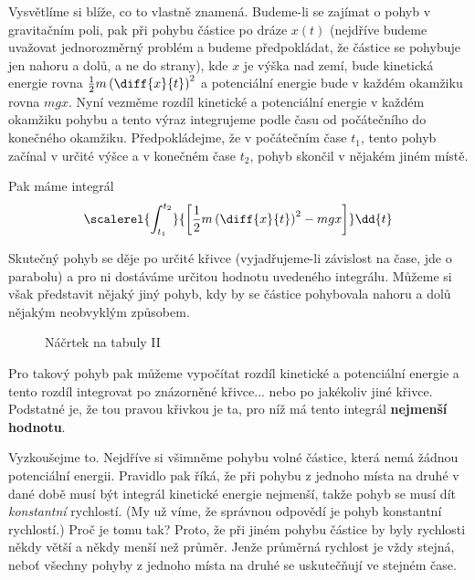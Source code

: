     Vysvětlíme si blíže, co to vlastně znamená. Budeme-li se zajímat o pohyb v gravitačním poli, pak
    při pohybu částice po dráze \(x(t)\) (nejdříve budeme uvažovat jednorozměrný problém a budeme
    předpokládat, že částice se pohybuje jen nahoru a dolů, a ne do strany), kde \(x\) je výška nad
    zemí, bude kinetická energie rovna \(\frac{1}{2}m\left(\diff{x}{t}\right)^2\) a potenciální
    energie bude v každém okamžiku rovna \(mgx\). Nyní vezměme rozdíl kinetické a potenciální
    energie v každém okamžiku pohybu a tento výraz integrujeme podle času od počátečního do
    konečného okamžiku. Předpokládejme, že v počátečním čase \(t_1\), tento pohyb začínal v určité
    výšce a v konečném čase \(t_2\), pohyb skončil v nějakém jiném místě. 

    Pak máme integrál
    \begin{equation*}
      \scalerel{\int_{t_1}^{t_2}}{\left[\frac{1}{2}m\left(\diff{x}{t}\right)^2 - mgx\right]}\dd{t}
    \end{equation*}

    Skutečný pohyb se děje po určité křivce (vyjadřujeme-li závislost na čase, jde o parabolu) a pro
    ni dostáváme určitou hodnotu uvedeného integrálu. Můžeme si však představit nějaký jiný pohyb,
    kdy by se částice pohybovala nahoru a dolů nějakým neobvyklým způsobem.

    \begin{figure}[ht!]
      \centering
        \hfill
      \caption{Náčrtek na tabuly II}
      \label{fyz:fig0653}
    \end{figure}
    
    Pro takový pohyb pak můžeme vypočítat rozdíl kinetické a potenciální energie a tento rozdíl
    integrovat po znázorněné křivce... nebo po jakékoliv jiné křivce. Podstatné je, že tou pravou
    křivkou je ta, pro níž má tento integrál \textbf{nejmenší hodnotu}.

    Vyzkoušejme to. Nejdříve si všimněme pohybu volné částice, která nemá žádnou potenciální
    energii. Pravidlo pak říká, že při pohybu z jednoho místa na druhé v dané době musí být integrál
    kinetické energie nejmenší, takže pohyb se musí dít \emph{konstantní} rychlostí. (My už víme, že
    správnou odpovědí je pohyb konstantní rychlostí.) Proč je tomu tak? Proto, že při jiném pohybu
    částice by byly rychlosti někdy větší a někdy menší než průměr. Jenže průměrná rychlost je vždy
    stejná, neboť všechny pohyby z jednoho místa na druhé se uskutečňují ve stejném čase.

